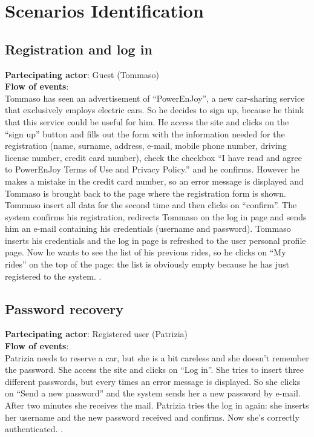 \pagebreak
\section{Scenarios Identification}

\newcommand{\Scen}[2]{
    \textbf{Partecipating actor}: #1 \\
    \textbf{Flow of events}: \\ #2.
}


\subsection{Registration and log in}
 
\Scen{Guest (Tommaso)}{
	Tommaso has seen an advertisement of “PowerEnJoy”, a new car-sharing service that exclusively employs electric cars. So he decides to sign up, because he think that this service could be useful for him.
    He access the site and clicks on the “sign up” button and fills out the form with the information needed for the registration (name, surname, address, e-mail, mobile phone number, driving license number, credit card number), check the checkbox “I have read and agree to PowerEnJoy Terms of Use and Privacy Policy.” and he confirms.
    However he makes a mistake in the credit card number, so an error message is displayed and Tommaso is brought back to the page where the registration form is shown. Tommaso insert all data for the second time and then clicks on “confirm”.
    The system confirms his registration, redirects Tommaso on the log in page and sends him an e-mail containing his credentials (username and password).
    Tommaso inserts his credentials and the log in page is refreshed to the user personal profile page.
    Now he wants to see the list of his previous rides, so he clicks on “My rides” on the top of the page: the list is obviously empty because he has just registered to the system.
}


\subsection{Password recovery}

\Scen{Registered user (Patrizia)}{
	Patrizia needs to reserve a car, but she is a bit careless and she doesn’t remember the password.
	She access the site and clicks on “Log in”. She tries to insert three different passwords, but every times an error message is displayed. So she clicks on “Send a new password” and the system sends her a new password by e-mail. After two minutes she receives the mail. Patrizia tries the log in again: she inserts her username and the new password received and confirms. Now she’s correctly authenticated.
}


